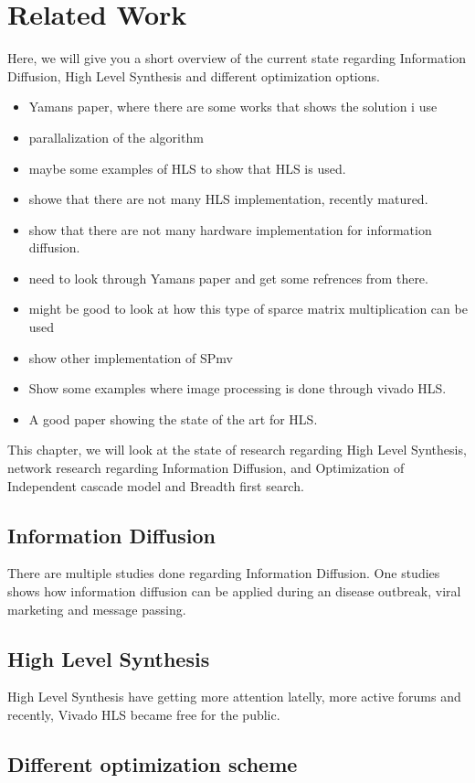 \chapter{Related Work}  \label{relatedWork}


Here, we will give you a short overview of the current state regarding Information Diffusion, High Level Synthesis and different optimization options.

\begin{itemize}
  
\item Yamans paper, where there are some works that shows the solution i use
\item parallalization of the algorithm
\item maybe some examples of HLS to show that HLS is used.
\item showe that there are not many HLS implementation, recently matured. 
\item show that there are not many hardware implementation for information diffusion.
\item need to look through Yamans paper and get some refrences from there.
\item might be good to look at how this type of sparce matrix multiplication can be used
\item show other implementation of SPmv
\item Show some examples where image processing is done through vivado HLS.
\item \cite{HLSTutorial} A good paper showing the state of the art for HLS.

\end{itemize}

This chapter, we will look at the state of research regarding High Level Synthesis, network research regarding Information Diffusion, and Optimization of Independent cascade model and Breadth first search.

\section{Information Diffusion}
There are multiple studies done regarding Information Diffusion. One studies shows how information diffusion can be applied during an disease outbreak\cite{InformationDiffusionThroughBlogspace}, viral marketing\cite{ViralMarketing} and message passing\cite{Starbird:2012:RRI:2145204.2145212}.

\section{High Level Synthesis}
High Level Synthesis have getting more attention latelly, more active forums and recently, Vivado HLS became free for the public.

\section{Different optimization scheme}

